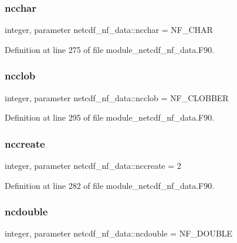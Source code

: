 \subsubsection{\texorpdfstring{ncchar}{ncchar}}
{\footnotesize\ttfamily integer, parameter netcdf\+\_\+nf\+\_\+data\+::ncchar = N\+F\+\_\+\+C\+H\+AR}



Definition at line 275 of file module\+\_\+netcdf\+\_\+nf\+\_\+data.\+F90.

\mbox{\label{namespacenetcdf__nf__data_a390b90425185669675d58dd9166deea1}} 
\subsubsection{\texorpdfstring{ncclob}{ncclob}}
{\footnotesize\ttfamily integer, parameter netcdf\+\_\+nf\+\_\+data\+::ncclob = N\+F\+\_\+\+C\+L\+O\+B\+B\+ER}



Definition at line 295 of file module\+\_\+netcdf\+\_\+nf\+\_\+data.\+F90.

\mbox{\label{namespacenetcdf__nf__data_a0cfdf3960977338f3e877e4e48f92d85}} 
\subsubsection{\texorpdfstring{nccreate}{nccreate}}
{\footnotesize\ttfamily integer, parameter netcdf\+\_\+nf\+\_\+data\+::nccreate = 2}



Definition at line 282 of file module\+\_\+netcdf\+\_\+nf\+\_\+data.\+F90.

\mbox{\label{namespacenetcdf__nf__data_a1a23437ca0df858742316afd15a5c469}} 
\subsubsection{\texorpdfstring{ncdouble}{ncdouble}}
{\footnotesize\ttfamily integer, parameter netcdf\+\_\+nf\+\_\+data\+::ncdouble = N\+F\+\_\+\+D\+O\+U\+B\+LE}



